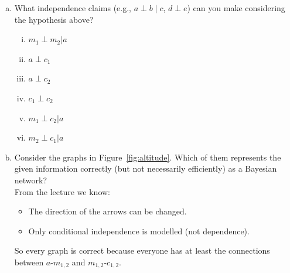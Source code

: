 \documentclass[12pt,a4paper,oneside]{article}
\begin{document}
\begin{enumerate}[a)]
\item What independence claims (e.g., $a \perp b \; | \; c$, $d \perp e$) can
  you make considering the hypothesis above?

\begin{enumerate} [i)]
	\item $m_1 \perp m_2 | a$	
	\item $a \perp c_1$ 
	\item $a \perp c_2$ 
	\item $c_1 \perp c_2$ 
	\item $m_1 \perp c_2 | a$  
	\item $m_2 \perp c_1 | a$    
\end{enumerate}

\item Consider the graphs in Figure~\ref{fig:altitude}. Which of them
  represents the given information correctly (but not necessarily efficiently)
  as a Bayesian network?\\
  
  From the lecture we know: 
\begin{itemize} 
  \item The direction of the arrows can be changed.
  \item Only conditional independence is modelled (not dependence).
\end{itemize} 
  So every graph is correct because everyone has at least the connections between $a$-$m_{1,2}$ and $m_{1,2}$-$c_{1,2}$. 
  

\end{enumerate}
\end{document}
